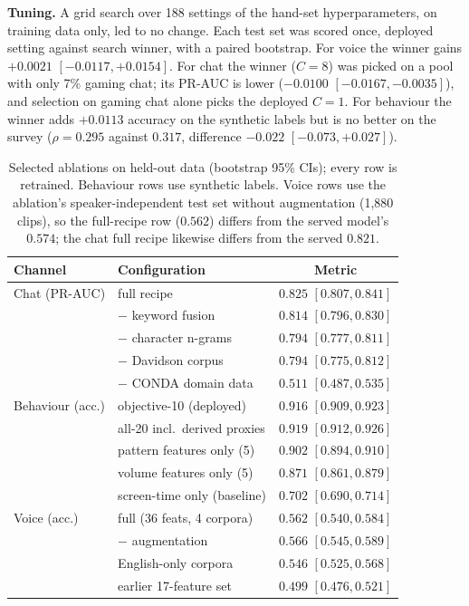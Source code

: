 \documentclass[conference]{IEEEtran}
\begin{document}
\textbf{Tuning.} A grid search over 188 settings of the hand-set hyperparameters, on
training data only, led to no change. Each test set was scored once, deployed setting
against search winner, with a paired bootstrap. For voice the winner gains $+0.0021$
$[-0.0117, +0.0154]$. For chat the winner ($C{=}8$) was picked on a pool with only 7\%
gaming chat; its PR-AUC is lower ($-0.0100$ $[-0.0167, -0.0035]$), and selection on
gaming chat alone picks the deployed $C{=}1$. For behaviour the winner adds $+0.0113$
accuracy on the synthetic labels but is no better on the survey ($\rho{=}0.295$ against
$0.317$, difference $-0.022$ $[-0.073, +0.027]$).

\begin{table}[t]
\centering\footnotesize
\caption{Selected ablations on held-out data (bootstrap 95\% CIs); every row is
retrained. Behaviour rows use synthetic labels. Voice rows use the ablation's
speaker-independent test set without augmentation (1{,}880 clips), so the full-recipe
row ($0.562$) differs from the served model's $0.574$; the chat full recipe likewise
differs from the served $0.821$.}
\label{tab:abl}
\begin{tabular}{@{}llc@{}}
\toprule
Channel & Configuration & Metric \\
\midrule
Chat (PR-AUC) & full recipe & $0.825$ $[0.807,0.841]$ \\
 & $-$ keyword fusion & $0.814$ $[0.796,0.830]$ \\
 & $-$ character n-grams & $0.794$ $[0.777,0.811]$ \\
 & $-$ Davidson corpus & $0.794$ $[0.775,0.812]$ \\
 & $-$ CONDA domain data & $\mathbf{0.511}$ $[0.487,0.535]$ \\
\midrule
Behaviour (acc.) & objective-10 (deployed) & $0.916$ $[0.909,0.923]$ \\
 & all-20 incl.\ derived proxies & $0.919$ $[0.912,0.926]$ \\
 & pattern features only (5) & $0.902$ $[0.894,0.910]$ \\
 & volume features only (5) & $0.871$ $[0.861,0.879]$ \\
 & screen-time only (baseline) & $\mathbf{0.702}$ $[0.690,0.714]$ \\
\midrule
Voice (acc.) & full (36 feats, 4 corpora) & $0.562$ $[0.540,0.584]$ \\
 & $-$ augmentation & $0.566$ $[0.545,0.589]$ \\
 & English-only corpora & $0.546$ $[0.525,0.568]$ \\
 & earlier 17-feature set & $0.499$ $[0.476,0.521]$ \\
\bottomrule
\end{tabular}
\end{table}
\end{document}
